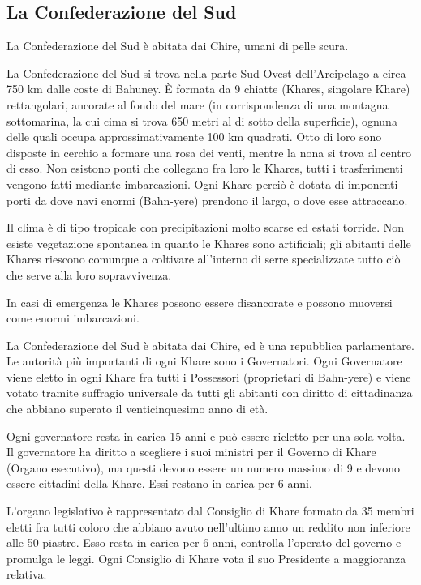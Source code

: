 \subsection{La Confederazione del Sud}


La Confederazione del Sud \`e abitata dai Chire, umani di pelle scura.

\Geografia La Confederazione del Sud si trova nella parte Sud Ovest
dell'Arcipelago a circa 750 km dalle coste di Bahuney. \`E formata da
9 chiatte (Khares, singolare Khare) rettangolari, ancorate al fondo
del mare (in corrispondenza di una montagna sottomarina, la cui cima
si trova 650 metri al di sotto della superficie), ognuna delle quali
occupa approssimativamente 100 km quadrati. Otto di loro sono
disposte in cerchio a formare una rosa dei venti, mentre la nona si
trova al centro di esso. Non esistono ponti che collegano fra loro le
Khares, tutti i trasferimenti vengono fatti mediante imbarcazioni.
Ogni Khare perci\`o \`e dotata di imponenti porti da dove navi
enormi (Bahn-yere) prendono il largo, o dove esse attraccano.

Il clima \`e di tipo tropicale con precipitazioni molto scarse ed
estati torride. Non esiste vegetazione spontanea in quanto le Khares
sono artificiali; gli abitanti delle Khares riescono comunque a
coltivare all'interno di serre specializzate tutto ci\`o che serve
alla loro sopravvivenza.

In casi di emergenza le Khares possono essere disancorate e possono
muoversi come enormi imbarcazioni.

\Politica La Confederazione del Sud \`e abitata dai Chire, ed \`e una
repubblica parlamentare. Le autorit\`a pi\`u importanti di ogni Khare
sono i Governatori. Ogni Governatore viene eletto in ogni Khare fra
tutti i Possessori (proprietari di Bahn-yere) e viene votato tramite
suffragio universale da tutti gli abitanti con diritto di cittadinanza
che abbiano superato il venticinquesimo anno di et\`a.

Ogni governatore resta in carica 15 anni e pu\`o essere rieletto per
una sola volta.  Il governatore ha diritto a scegliere i suoi ministri
per il Governo di Khare (Organo esecutivo), ma questi devono essere un
numero massimo di 9 e devono essere cittadini della Khare. Essi
restano in carica per 6 anni.

L'organo legislativo \`e rappresentato dal Consiglio di Khare formato
da 35 membri eletti fra tutti coloro che abbiano avuto nell'ultimo
anno un reddito non inferiore alle 50 piastre. Esso resta in carica
per 6 anni, controlla l'operato del governo e promulga le leggi. Ogni
Consiglio di Khare vota il suo Presidente a maggioranza relativa.

